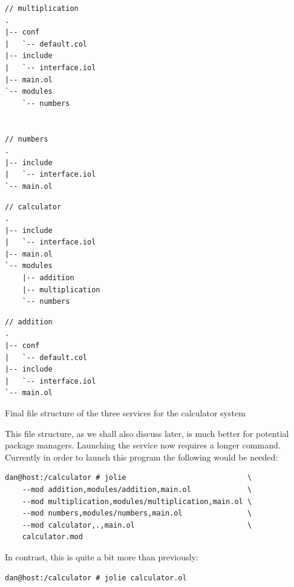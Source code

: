 \begin{listing}[H]

\begin{multicols}{3}

\begin{verbatim}
// multiplication
.
|-- conf
|   `-- default.col
|-- include
|   `-- interface.iol
|-- main.ol
`-- modules
    `-- numbers


// numbers
.
|-- include
|   `-- interface.iol
`-- main.ol
\end{verbatim}

\columnbreak

\begin{verbatim}
// calculator
.
|-- include
|   `-- interface.iol
|-- main.ol
`-- modules
    |-- addition
    |-- multiplication
    `-- numbers
\end{verbatim}

\columnbreak

\begin{verbatim}
// addition
.
|-- conf
|   `-- default.col
|-- include
|   `-- interface.iol
`-- main.ol
\end{verbatim}

\end{multicols}

\caption{Final file structure of the three services for the calculator system}
\label{lst:final_file_structure}
\end{listing}

This file structure, as we shall also discuss later, is much better for
potential package managers. Launching the service now requires a longer
command. Currently in order to launch this program the following would be
needed:

\begin{verbatim}
dan@host:/calculator # jolie                            \
    --mod addition,modules/addition,main.ol             \
    --mod multiplication,modules/multiplication,main.ol \
    --mod numbers,modules/numbers,main.ol               \
    --mod calculator,.,main.ol                          \
    calculator.mod
\end{verbatim}

In contrast, this is quite a bit more than previously:

\begin{verbatim}
dan@host:/calculator # jolie calculator.ol
\end{verbatim}

